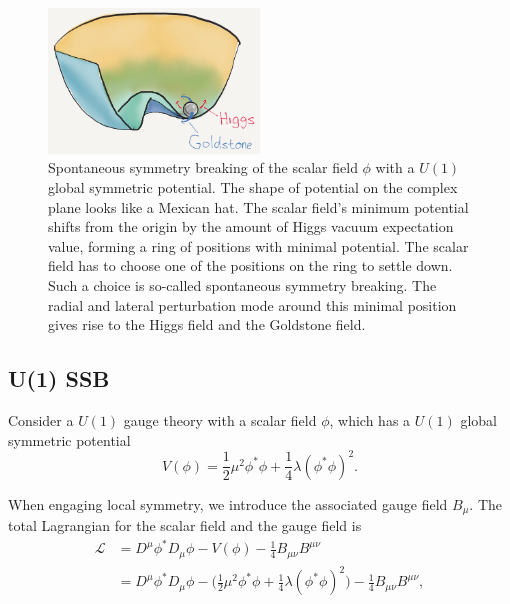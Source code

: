 \begin{figure}[ht]
    \centering
    \includegraphics[width=0.5\textwidth]{chapters/RelatedWorks/sectionQFT/figures/Higgs.png}
    \caption{Spontaneous symmetry breaking of the scalar field $\phi$  with a $U(1)$  global symmetric potential. The shape of potential on the complex plane looks like a Mexican hat. The scalar field's minimum potential shifts from the origin by the amount of Higgs vacuum expectation value, forming a ring of positions with minimal potential. The scalar field has to choose one of the positions on the ring to settle down. Such a choice is so-called spontaneous symmetry breaking. The radial and lateral perturbation mode around this minimal position gives rise to the Higgs field and the Goldstone field. }
    \label{fig:relatedWorks:qft:higgsPotential}
\end{figure}



\subsection{U(1) SSB}

Consider a $U(1)$ gauge theory with a scalar field $\phi$, which has a $U(1)$ global symmetric potential
\begin{equation}
    V(\phi) = \frac{1}{2} \mu^2 \phi^*\phi + \frac{1}{4}\lambda(\phi^*\phi )^2.
\end{equation}


\noindent When engaging local symmetry, we introduce the associated gauge field $B_{\mu}$. The total Lagrangian for the scalar field and the gauge field is
\begin{equation}
\begin{split}
	\mathcal{L} & = D^\mu\phi^* D_\mu\phi-V(\phi)   - \frac{1}{4}B_{\mu\nu}B^{\mu\nu} \\
	& = D^\mu\phi^* D_\mu\phi- \big(\frac{1}{2} \mu^2 \phi^*\phi + \frac{1}{4} \lambda(\phi^*\phi )^2 \big)   - \frac{1}{4}B_{\mu\nu}B^{\mu\nu},
\end{split}
\label{eqn:relatedWorks:qft:u1Higgs}
\end{equation}

